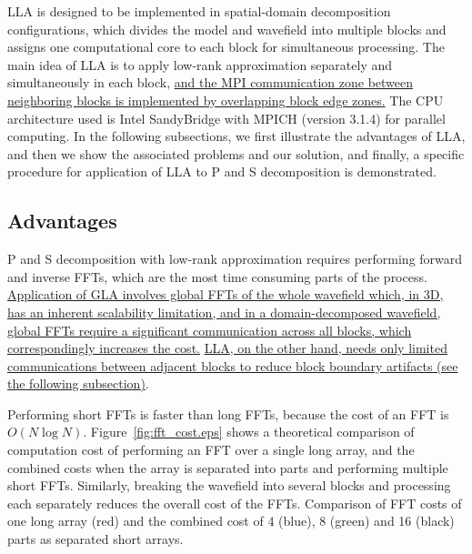 \documentclass[manuscript,ulem,graphix,revised]{geophysics}
\begin{document}
LLA is designed to be implemented in spatial-domain decomposition configurations, which divides the model and wavefield into multiple blocks and assigns one computational core to each block for simultaneous processing. The main idea of LLA is to apply low-rank approximation separately and simultaneously in each block, \marginnote{[23, 24]} \uline{and the MPI communication zone between neighboring blocks is implemented by overlapping block edge zones.} The CPU architecture used is Intel SandyBridge \marginnote{[24]} with MPICH (version 3.1.4) for parallel computing.
In the following subsections, we first illustrate the advantages of LLA, and then we show the associated problems and our solution, and finally, a specific procedure for application of LLA to P and S decomposition is demonstrated.



\subsection{Advantages}
\indent\indent
P and S decomposition with low-rank approximation requires performing forward and inverse FFTs, which are the most time consuming parts of the process. 
\marginnote{[25]}\uline{Application of GLA involves global FFTs of the whole wavefield which, in 3D, has an inherent scalability limitation, and in a domain-decomposed wavefield, global FFTs require a significant communication across all blocks, which correspondingly increases the cost.} \uline{LLA, on the other hand, needs only limited communications between adjacent blocks to reduce block boundary artifacts (see the following subsection)}.\marginnote{[24]}

Performing short FFTs is faster than long FFTs, because the cost of an FFT is $O(N\log{N})$. Figure~\ref{fig:fft_cost.eps} shows a theoretical comparison of computation cost of performing an FFT over a single long array, and the combined costs when the array is separated into parts and performing multiple short FFTs. 
Similarly, breaking the wavefield into several blocks and processing each separately reduces the overall cost of the FFTs. 
{
Comparison of FFT costs of one long array (red) and the combined cost of 4 (blue), 8 (green) and 16 (black) parts as separated short arrays.
}

\end{document}
